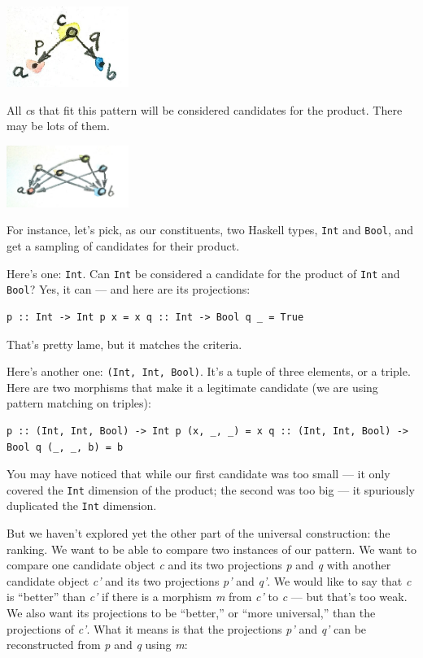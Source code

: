 \includegraphics[width=1.56250in]{images/productpattern.jpg}

All \emph{c}s that fit this pattern will be considered candidates for
the product. There may be lots of them.

\includegraphics[width=1.56250in]{images/productcandidates.jpg}

For instance, let's pick, as our constituents, two Haskell types,
\texttt{Int} and \texttt{Bool}, and get a sampling of candidates for
their product.

Here's one: \texttt{Int}. Can \texttt{Int} be considered a candidate for
the product of \texttt{Int} and \texttt{Bool}? Yes, it can --- and here
are its projections:

\begin{verbatim}
p :: Int -> Int p x = x q :: Int -> Bool q _ = True
\end{verbatim}

That's pretty lame, but it matches the criteria.

Here's another one: \texttt{(Int,\ Int,\ Bool)}. It's a tuple of three
elements, or a triple. Here are two morphisms that make it a legitimate
candidate (we are using pattern matching on triples):

\begin{verbatim}
p :: (Int, Int, Bool) -> Int p (x, _, _) = x q :: (Int, Int, Bool) -> Bool q (_, _, b) = b
\end{verbatim}

You may have noticed that while our first candidate was too small --- it
only covered the \texttt{Int} dimension of the product; the second was
too big --- it spuriously duplicated the \texttt{Int} dimension.

But we haven't explored yet the other part of the universal
construction: the ranking. We want to be able to compare two instances
of our pattern. We want to compare one candidate object \emph{c} and its
two projections \emph{p} and \emph{q} with another candidate object
\emph{c'} and its two projections \emph{p'} and \emph{q'}. We would like
to say that \emph{c} is ``better'' than \emph{c'} if there is a morphism
\emph{m} from \emph{c'} to \emph{c} --- but that's too weak. We also
want its projections to be ``better,'' or ``more universal,'' than the
projections of \emph{c'}. What it means is that the projections
\emph{p'} and \emph{q'} can be reconstructed from \emph{p} and \emph{q}
using \emph{m}:

